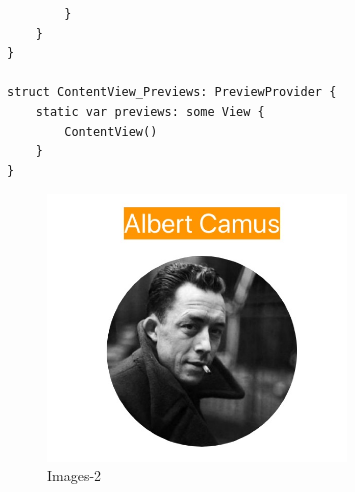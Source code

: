 \documentclass[a4paper,12pt]{article}
\begin{document}
\begin{enumerate}
\begin{lstlisting}
        }
    }
}

struct ContentView_Previews: PreviewProvider {
    static var previews: some View {
        ContentView()
    }
}
\end{lstlisting}

\begin{figure}[htbp]
\centering
\includegraphics[width=300]{images/image-2.jpg}
\caption{\label{fig:Images-2}Images-2}
\end{figure}
\end{enumerate}
\end{document}
